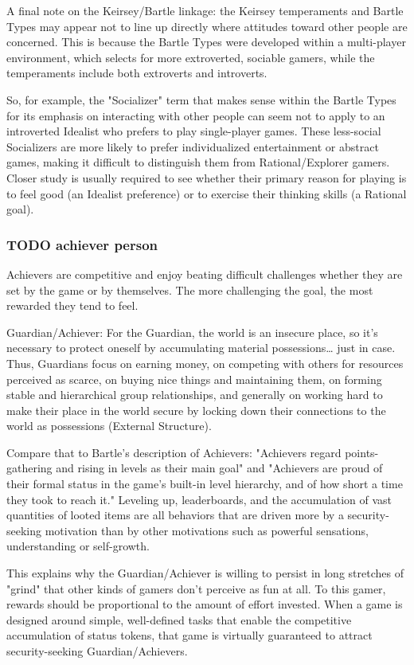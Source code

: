 \documentclass[11pt]{article}
\begin{document}
A final note on the Keirsey/Bartle linkage: the Keirsey temperaments
and Bartle Types may appear not to line up directly where attitudes
toward other people are concerned. This is because the Bartle Types
were developed within a multi-player environment, which selects for
more extroverted, sociable gamers, while the temperaments include
both extroverts and introverts.

So, for example, the "Socializer" term that makes sense within the
Bartle Types for its emphasis on interacting with other people can
seem not to apply to an introverted Idealist who prefers to play
single-player games. These less-social Socializers are more likely to
prefer individualized entertainment or abstract games, making it
difficult to distinguish them from Rational/Explorer gamers. Closer
study is usually required to see whether their primary reason for
playing is to feel good (an Idealist preference) or to exercise their
thinking skills (a Rational goal).
\subsubsection{{\bfseries\sffamily TODO} achiever person}
\label{sec-2-2-9}

Achievers are competitive and enjoy beating difficult challenges
whether they are set by the game or by themselves. The more
challenging the goal, the most rewarded they tend to feel.

Guardian/Achiever: For the Guardian, the world is an insecure place,
so it's necessary to protect oneself by accumulating material
possessions\ldots{} just in case. Thus, Guardians focus on earning money,
on competing with others for resources perceived as scarce, on buying
nice things and maintaining them, on forming stable and hierarchical
group relationships, and generally on working hard to make their
place in the world secure by locking down their connections to the
world as possessions (External Structure).

Compare that to Bartle's description of Achievers: "Achievers regard
points-gathering and rising in levels as their main goal" and
"Achievers are proud of their formal status in the game's built-in
level hierarchy, and of how short a time they took to reach it."
Leveling up, leaderboards, and the accumulation of vast quantities of
looted items are all behaviors that are driven more by a
security-seeking motivation than by other motivations such as
powerful sensations, understanding or self-growth.

This explains why the Guardian/Achiever is willing to persist in long
stretches of "grind" that other kinds of gamers don't perceive as fun
at all. To this gamer, rewards should be proportional to the amount of
effort invested. When a game is designed around simple, well-defined
tasks that enable the competitive accumulation of status tokens, that
game is virtually guaranteed to attract security-seeking
Guardian/Achievers.
\end{document}
